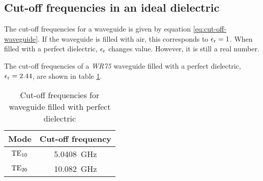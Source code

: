 \subsection{Cut-off frequencies in an ideal dielectric}
The cut-off frequencies for a waveguide is given by equation \ref{eq:cut-off-waveguide}. If the waveguide is filled with air, this corresponds to $\epsilon _{\rm r} = 1$. When filled with a perfect dielectric, $\epsilon _{\rm r}$ changes value. However, it is still a real number. \par
The cut-off frequencies of a \emph{WR75} waveguide filled with a perfect dielectric, $\epsilon _{\rm r} = 2.44$, are shown in table \ref{tab:cut-off-student-nr}.

\begin{table}[h t b p]
\centering
\caption{Cut-off frequencies for waveguide filled with perfect dielectric}
\begin{tabular}{|c|c|} \hline
Mode & Cut-off frequency \\ \hline
${\rm TE}_{\rm 10}$ & \SI{5.0408}{\giga\hertz} \\
${\rm TE}_{\rm 20}$ & \SI{10.082}{\giga\hertz} \\ \hline
\end{tabular}
\label{tab:cut-off-student-nr}
\end{table}